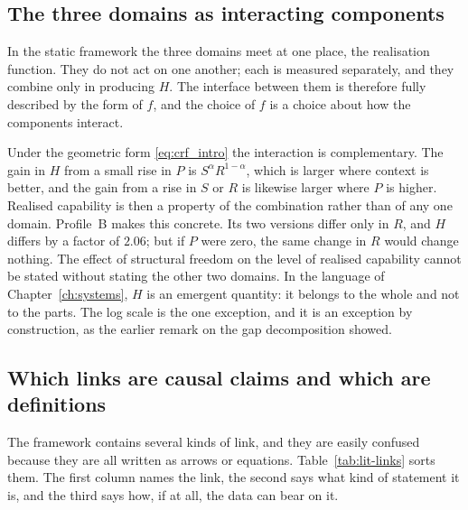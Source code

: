 \subsection{The three domains as interacting components}

In the static framework the three domains meet at one place, the realisation function. They do not act on one another; each is measured separately, and they combine only in producing $H$. The interface between them is therefore fully described by the form of $f$, and the choice of $f$ is a choice about how the components interact.

Under the geometric form \eqref{eq:crf_intro} the interaction is complementary. The gain in $H$ from a small rise in $P$ is $S^{\alpha}R^{1-\alpha}$, which is larger where context is better, and the gain from a rise in $S$ or $R$ is likewise larger where $P$ is higher. Realised capability is then a property of the combination rather than of any one domain. Profile~B makes this concrete. Its two versions differ only in $R$, and $H$ differs by a factor of $2.06$; but if $P$ were zero, the same change in $R$ would change nothing. The effect of structural freedom on the level of realised capability cannot be stated without stating the other two domains. In the language of Chapter~\ref{ch:systems}, $H$ is an emergent quantity: it belongs to the whole and not to the parts. The log scale is the one exception, and it is an exception by construction, as the earlier remark on the gap decomposition showed.

\subsection{Which links are causal claims and which are definitions}

The framework contains several kinds of link, and they are easily confused because they are all written as arrows or equations. Table~\ref{tab:lit-links} sorts them. The first column names the link, the second says what kind of statement it is, and the third says how, if at all, the data can bear on it.

